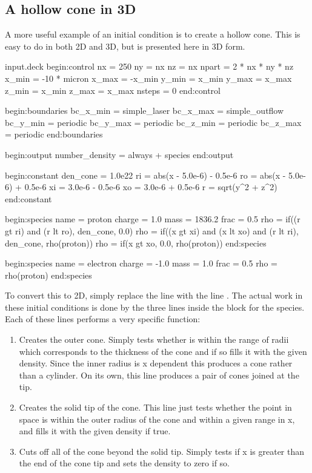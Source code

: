 \subsection{A hollow cone in 3D}
A more useful example of an initial condition is to create a hollow cone. This
is easy to do in both 2D and 3D, but is presented here in 3D form.
\begin{lboxverbatim}{input.deck}
begin:control
   nx = 250
   ny = nx
   nz = nx
   npart = 2 * nx * ny * nz
   x_min = -10 * micron
   x_max = -x_min
   y_min = x_min
   y_max = x_max
   z_min = x_min
   z_max = x_max
   nsteps = 0
end:control

begin:boundaries
   bc_x_min = simple_laser
   bc_x_max = simple_outflow
   bc_y_min = periodic
   bc_y_max = periodic
   bc_z_min = periodic
   bc_z_max = periodic
end:boundaries

begin:output
   number_density = always + species
end:output

begin:constant
   den_cone = 1.0e22
   ri = abs(x - 5.0e-6) - 0.5e-6
   ro = abs(x - 5.0e-6) + 0.5e-6
   xi = 3.0e-6 - 0.5e-6
   xo = 3.0e-6 + 0.5e-6
   r = sqrt(y^2 + z^2)
end:constant

begin:species
   name = proton
   charge = 1.0
   mass = 1836.2
   frac = 0.5
   rho = if((r gt ri) and (r lt ro), den_cone, 0.0)
   rho = if((x gt xi) and (x lt xo) and (r lt ri), den_cone, rho(proton))
   rho = if(x gt xo, 0.0, rho(proton))
end:species

begin:species
   name = electron
   charge = -1.0
   mass = 1.0
   frac = 0.5
   rho = rho(proton)
end:species
\end{lboxverbatim}

To convert this to 2D, simply replace the line
 with the line . The
actual work in these initial conditions is done by the three lines inside the
block for the  species. Each of these lines performs a very
specific function:

\begin{enumerate}
\item Creates the outer cone. Simply tests whether  is within
  the range of radii which corresponds to the thickness of the cone and if so
  fills it with the given density. Since the inner radius is x dependent this
  produces a cone rather than a cylinder. On its own, this line produces a
  pair of cones joined at the tip.
\item Creates the solid tip of the cone. This line just tests whether the
  point in space is within the outer radius of the cone and within a given
  range in x, and fills it with the given density if true.
\item Cuts off all of the cone beyond the solid tip. Simply tests if x is
  greater than the end of the cone tip and sets the density to zero if so.
\end{enumerate}

